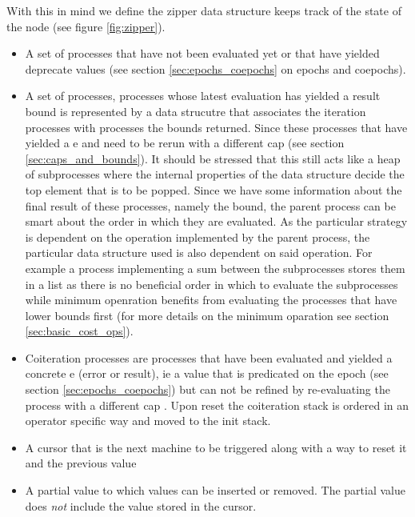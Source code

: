 With this in mind we define the zipper data structure keeps track of
the state of the node (see figure \ref{fig:zipper}).

\begin{itemize}
\item A set of  processes that have not been evaluated
  yet or that have yielded deprecate values (see section
  \ref{sec:epochs_coepochs} on epochs and coepochs).
\item A set of  processes, processes whose latest
  evaluation has yielded a result bound is represented by a data
  strucutre that associates the iteration processes with
   processes the bounds returned. Since these processes
  that have yielded a e and need to be rerun with a different cap (see
  section \ref{sec:caps_and_bounds}). It should be stressed that this
  still acts like a heap of subprocesses where the internal properties
  of the data structure decide the top element that is to be
  popped. Since we have some information about the final result of
  these processes, namely the bound, the parent process can be smart
  about the order in which they are evaluated. As the particular
  strategy is dependent on the operation implemented by the parent
  process, the particular data structure used is also dependent on
  said operation. For example a process implementing a sum between the
  subprocesses stores them in a list as there is no beneficial order
  in which to evaluate the subprocesses while minimum openration
  benefits from evaluating the processes that have lower bounds first
  (for more details on the minimum oparation see section
  \ref{sec:basic_cost_ops}).
\item Coiteration processes are processes that have been evaluated and
  yielded a concrete e (error or result), ie a value that is
  predicated on the epoch (see section \ref{sec:epochs_coepochs}) but
  can not be refined by re-evaluating the process with a different cap
  . Upon reset the coiteration
  stack is ordered in an operator specific way and moved to the init
  stack.
\item A cursor that is the next machine to be triggered along with a
  way to reset it and the previous value
\item A partial value to which values can be inserted or removed. The
  partial value does \emph{not} include the value stored in the
  cursor.
\end{itemize}

